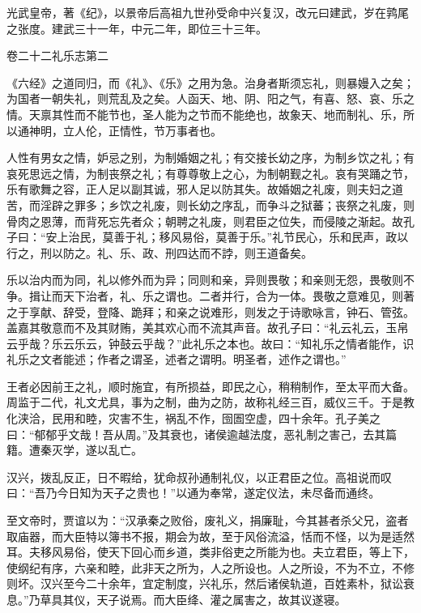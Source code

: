 \documentclass[12pt,UTF8]{ctexbook}
\begin{document}
光武皇帝，著《纪》，以景帝后高祖九世孙受命中兴复汉，改元曰建武，岁在鹑尾之张度。建武三十一年，中元二年，即位三十三年。





卷二十二礼乐志第二



《六经》之道同归，而《礼》、《乐》之用为急。治身者斯须忘礼，则暴嫚入之矣；为国者一朝失礼，则荒乱及之矣。人函天、地、阴、阳之气，有喜、怒、哀、乐之情。天禀其性而不能节也，圣人能为之节而不能绝也，故象天、地而制礼、乐，所以通神明，立人伦，正情性，节万事者也。



人性有男女之情，妒忌之别，为制婚姻之礼；有交接长幼之序，为制乡饮之礼；有哀死思远之情，为制丧祭之礼；有尊尊敬上之心，为制朝觐之礼。哀有哭踊之节，乐有歌舞之容，正人足以副其诚，邪人足以防其失。故婚姻之礼废，则夫妇之道苦，而淫辟之罪多；乡饮之礼废，则长幼之序乱，而争斗之狱蕃；丧祭之礼废，则骨肉之恩薄，而背死忘先者众；朝聘之礼废，则君臣之位失，而侵陵之渐起。故孔子曰：“安上治民，莫善于礼；移风易俗，莫善于乐。”礼节民心，乐和民声，政以行之，刑以防之。礼、乐、政、刑四达而不誖，则王道备矣。



乐以治内而为同，礼以修外而为异；同则和亲，异则畏敬；和亲则无怨，畏敬则不争。揖让而天下治者，礼、乐之谓也。二者并行，合为一体。畏敬之意难见，则著之于享献、辞受，登降、跪拜；和亲之说难形，则发之于诗歌咏言，钟石、管弦。盖嘉其敬意而不及其财贿，美其欢心而不流其声音。故孔子曰：“礼云礼云，玉帛云乎哉？乐云乐云，钟鼓云乎哉？”此礼乐之本也。故曰：“知礼乐之情者能作，识礼乐之文者能述；作者之谓圣，述者之谓明。明圣者，述作之谓也。”



王者必因前王之礼，顺时施宜，有所损益，即民之心，稍稍制作，至太平而大备。周监于二代，礼文尤具，事为之制，曲为之防，故称礼经三百，威仪三千。于是教化浃洽，民用和睦，灾害不生，祸乱不作，囹圄空虚，四十余年。孔子美之曰：“郁郁乎文哉！吾从周。”及其衰也，诸侯逾越法度，恶礼制之害己，去其篇籍。遭秦灭学，遂以乱亡。



汉兴，拨乱反正，日不暇给，犹命叔孙通制礼仪，以正君臣之位。高祖说而叹曰：“吾乃今日知为天子之贵也！”以通为奉常，遂定仪法，未尽备而通终。



至文帝时，贾谊以为：“汉承秦之败俗，废礼义，捐廉耻，今其甚者杀父兄，盗者取庙器，而大臣特以簿书不报，期会为故，至于风俗流溢，恬而不怪，以为是适然耳。夫移风易俗，使天下回心而乡道，类非俗吏之所能为也。夫立君臣，等上下，使纲纪有序，六亲和睦，此非天之所为，人之所设也。人之所设，不为不立，不修则坏。汉兴至今二十余年，宜定制度，兴礼乐，然后诸侯轨道，百姓素朴，狱讼衰息。”乃草具其仪，天子说焉。而大臣绛、灌之属害之，故其议遂寝。
\end{document}
